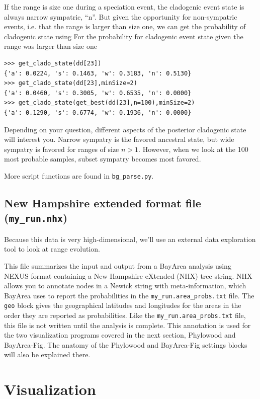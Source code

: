 \documentclass[11pt]{article}
\begin{document}
If the range is size one during a speciation event, the cladogenic event state is always narrow sympatric, ``n''.
But given the opportunity for non-sympatric events, i.e. that the range is larger than size one, we can get the probability of cladogenic state using
For the probability for cladogenic event state given the range was larger than size one
\begin{snugshade}
\begin{lstlisting}
>>> get_clado_state(dd[23])
{'a': 0.0224, 's': 0.1463, 'w': 0.3183, 'n': 0.5130}
>>> get_clado_state(dd[23],minSize=2)
{'a': 0.0460, 's': 0.3005, 'w': 0.6535, 'n': 0.0000}
>>> get_clado_state(get_best(dd[23],n=100),minSize=2)
{'a': 0.1290, 's': 0.6774, 'w': 0.1936, 'n': 0.0000}
\end{lstlisting}
\end{snugshade}

Depending on your question, different aspects of the posterior cladogenic state will interest you.
Narrow sympatry is the favored ancestral state, but wide sympatry is favored for ranges of size $n>1$.
However, when we look at the 100 most probable samples, subset sympatry becomes most favored.

More script functions are found in {\tt bg\_parse.py}.

\subsection{New Hampshire extended format file (\texttt{my\_run.nhx})}

Because this data is very high-dimensional, we'll use an external data exploration tool to look at range evolution.

This file summarizes the input and output from a BayArea analysis using NEXUS format containing a New Hampshire eXtended (NHX) tree string.
NHX allows you to annotate nodes in a Newick string with meta-information, which BayArea uses to report the probabilities in the \texttt{my\_run.area\_probs.txt} file.
The \texttt{geo} block gives the geographical latitudes and longitudes for the areas in the order they are reported as probabilities.
Like the \texttt{my\_run.area\_probs.txt} file, this file is not written until the analysis is complete.
This annotation is used for the two visualization programs covered in the next section, Phylowood and BayArea-Fig.
The anatomy of the Phylowood and BayArea-Fig settings blocks will also be explained there.

\section{Visualization}
\end{document}
